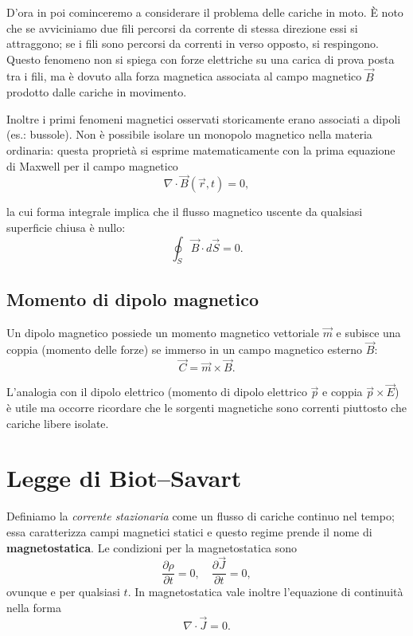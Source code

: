 \documentclass{book}
\begin{document}
D'ora in poi cominceremo a considerare il problema delle cariche in moto. \`E noto che se avviciniamo due fili percorsi da corrente di stessa direzione essi si attraggono; se i fili sono percorsi da correnti in verso opposto, si respingono. Questo fenomeno non si spiega con forze elettriche su una carica di prova posta tra i fili, ma \`e dovuto alla forza magnetica associata al campo magnetico $\vec B$ prodotto dalle cariche in movimento.

Inoltre i primi fenomeni magnetici osservati storicamente erano associati a dipoli (es.: bussole). Non \`e possibile isolare un monopolo magnetico nella materia ordinaria: questa propriet\`a si esprime matematicamente con la prima equazione di Maxwell per il campo magnetico
\begin{equation}
\nabla\cdot\vec B(\vec r,t)=0,
\end{equation}

la cui forma integrale implica che il flusso magnetico uscente da qualsiasi superficie chiusa \`e nullo:
\begin{equation}
\oint_{S}\vec B\cdot d\vec S = 0.
\end{equation}

\subsection{Momento di dipolo magnetico}

Un dipolo magnetico possiede un momento magnetico vettoriale $\vec m$ e subisce una coppia (momento delle forze) se immerso in un campo magnetico esterno $\vec B$:
\begin{equation}
\vec C = \vec m \times \vec B.
\end{equation}

L'analogia con il dipolo elettrico (momento di dipolo elettrico $\vec p$ e coppia $\vec p\times\vec E$) \`e utile ma occorre ricordare che le sorgenti magnetiche sono correnti piuttosto che cariche libere isolate.

\section{Legge di Biot--Savart}

Definiamo la \textit{corrente stazionaria} come un flusso di cariche continuo nel tempo; essa caratterizza campi magnetici statici e questo regime prende il nome di \textbf{magnetostatica}. Le condizioni per la magnetostatica sono
\[
\frac{\partial \rho}{\partial t}=0,\quad \frac{\partial \vec{J}}{\partial t}=0,
\]
ovunque e per qualsiasi $t$. In magnetostatica vale inoltre l'equazione di continuit\`a nella forma
\[
\nabla\cdot\vec J = 0.
\]
\end{document}
